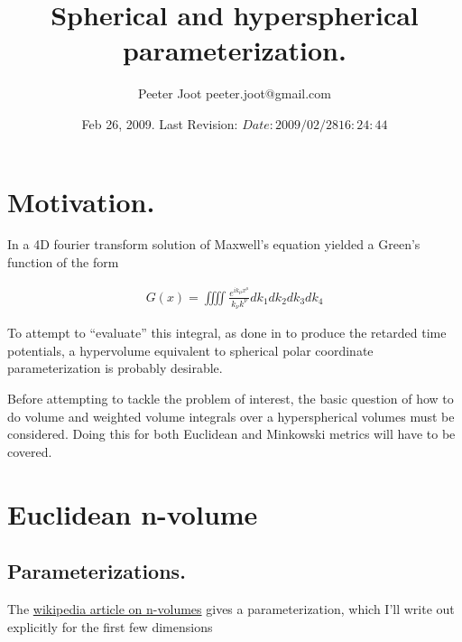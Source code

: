 \documentclass{article}
\title{ Spherical and hyperspherical parameterization. }
\author{Peeter Joot \quad peeter.joot@gmail.com }
\date{ Feb 26, 2009.  Last Revision: $Date: 2009/02/28 16:24:44 $ }
\begin{document}
\maketitle{}
\tableofcontents

\section{ Motivation. }

In \cite{PJ4dFourier} a 4D fourier transform solution 
of Maxwell's equation yielded a Green's function of the form

\begin{align*}
G(x) = \iiiint \frac{e^{i k_\mu x^\mu}}{k_\nu k^\nu} dk_1 dk_2 dk_3 dk_4
\end{align*}

To attempt to ``evaluate'' this integral, as done in
\cite{PJpoisson}
to produce the retarded time potentials,
a hypervolume equivalent to spherical polar coordinate
parameterization is probably desirable.

Before attempting to tackle the problem of interest, the basic question
of how to do volume and weighted volume integrals over a hyperspherical volumes
must be considered.  Doing this for both Euclidean and Minkowski metrics will have to be covered.

\section{ Euclidean n-volume }

\subsection{ Parameterizations. }

The \href{http://en.wikipedia.org/wiki/Hypersphere}{wikipedia article on n-volumes} gives a parameterization, which I'll write out explicitly for the first few dimensions
\end{document}
